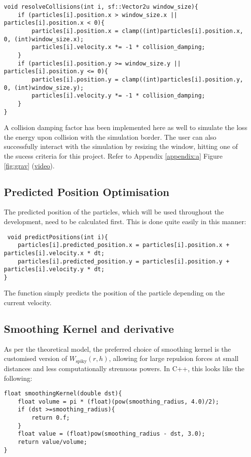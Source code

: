\documentclass[write-up.tex]{subfiles}
\begin{document}
\begin{lstlisting}
void resolveCollisions(int i, sf::Vector2u window_size){
    if (particles[i].position.x > window_size.x || particles[i].position.x < 0){
        particles[i].position.x = clamp((int)particles[i].position.x, 0, (int)window_size.x);
        particles[i].velocity.x *= -1 * collision_damping;
    }
    if (particles[i].position.y >= window_size.y || particles[i].position.y <= 0){
        particles[i].position.y = clamp((int)particles[i].position.y, 0, (int)window_size.y);
        particles[i].velocity.y *= -1 * collision_damping;
    }
}
\end{lstlisting}

A collision damping factor has been implemented here as well to simulate the loss the energy upon collision with the simulation border. The user can also successfully interact with the simulation by resizing the window, hitting one of the sucess criteria for this project. Refer to Appendix \ref{appendix:a} Figure \ref{fig:grav} (\href{https://youtube.com/shorts/wO0xUBSKVck?feature=share}{video}).
\subsection{Predicted Position Optimisation}

The predicted position of the particles, which will be used throughout the development, need to be calculated first. This is done quite easily in this manner:

\begin{lstlisting}
 void predictPositions(int i){
    particles[i].predicted_position.x = particles[i].position.x + particles[i].velocity.x * dt;
    particles[i].predicted_position.y = particles[i].position.y + particles[i].velocity.y * dt;
}
\end{lstlisting}
The function simply predicts the position of the particle depending on the current velocity.


\subsection{Smoothing Kernel and derivative}

As per the theoretical model, the preferred choice of smoothing kernel is the customised version of $W_{\text{spiky}}(r, h)$, allowing for large repulsion forces at small distances and less computationally strenuous powers. In C++, this looks like the following:

\begin{lstlisting}
float smoothingKernel(double dst){
    float volume = pi * (float)(pow(smoothing_radius, 4.0)/2);
    if (dst >=smoothing_radius){
        return 0.f;
    }
    float value = (float)pow(smoothing_radius - dst, 3.0);
    return value/volume;
}
\end{lstlisting}
\end{document}
